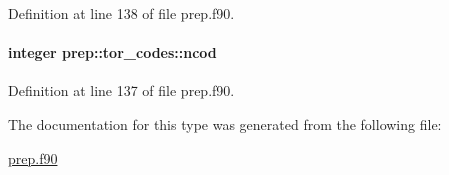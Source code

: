 Definition at line 138 of file prep.\-f90.

\hypertarget{structprep_1_1tor__codes_a7997fde522fab4d6917a08efbf41a790}{
\paragraph[{ncod}]{\setlength{\rightskip}{0pt plus 5cm}integer prep\-::tor\-\_\-codes\-::ncod}}\label{structprep_1_1tor__codes_a7997fde522fab4d6917a08efbf41a790}


Definition at line 137 of file prep.\-f90.



The documentation for this type was generated from the following file\-:\begin{DoxyCompactItemize}
\item 
\hyperlink{prep_8f90}{prep.\-f90}\end{DoxyCompactItemize}
